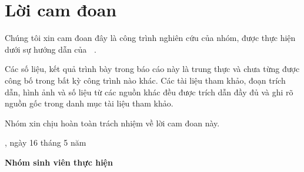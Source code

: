 
\chapter*{Lời cam đoan}

\vspace{1cm}

Chúng tôi xin cam đoan đây là công trình nghiên cứu của nhóm, được thực hiện dưới sự hướng dẫn của \textbf{\supervisortitle~\supervisor}.

Các số liệu, kết quả trình bày trong báo cáo này là trung thực và chưa từng được công bố trong bất kỳ công trình nào khác. Các tài liệu tham khảo, đoạn trích dẫn, hình ảnh và số liệu từ các nguồn khác đều được trích dẫn đầy đủ và ghi rõ nguồn gốc trong danh mục tài liệu tham khảo.

Nhóm xin chịu hoàn toàn trách nhiệm về lời cam đoan này.

\vspace{1.5cm}

\begin{flushright}
    \location, ngày 16 tháng 5 năm \reportyear

    \textbf{Nhóm sinh viên thực hiện}

    \vspace{2cm}
\end{flushright}

\newpage

